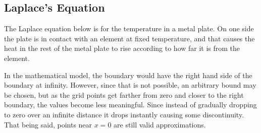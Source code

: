 \subsection{Laplace's Equation}
The Laplace equation below is for the temperature in a metal plate.
On one side the plate is in contact with an element at fixed
temperature, and that causes the heat in the rest of the metal plate
to rise according to how far it is from the element.

In the mathematical model, the boundary would have the
right hand side of the boundary at infinity. However, since that is
not possible, an arbitrary bound may be chosen, but as the grid points get
farther from zero and closer to the right boundary, the values become
less meaningful. Since instead of gradually dropping to zero over an
infinite distance it drops instantly causing some discontinuity. That
being said, points near $x=0$ are still valid approximations.

